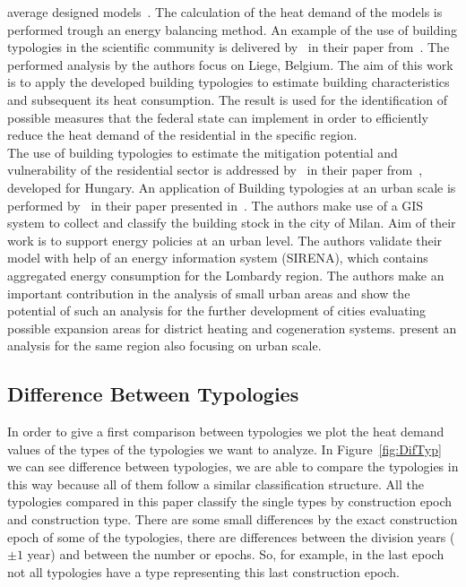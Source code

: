 \documentclass[authoryear,preprint,review,12pt]{elsarticle}
\begin{document}
\begin{linenumbers}
average designed models~\cite{Kragh.2013}.  The calculation of the heat
demand of the models is performed trough an energy balancing method.  An
example of the use of building typologies in the scientific community is
delivered by~\citeauthor{Singh.2013} in their paper
from~\citeyear{Singh.2013}.  The performed analysis by the authors
focus on Liege, Belgium. The aim of this work is to apply the developed
building typologies to estimate building characteristics and subsequent its
heat consumption. The result is used for the identification of possible
measures that the federal state can implement in order to efficiently reduce
the heat demand of the residential in the specific region.\\

The use of building typologies to estimate the mitigation potential and
vulnerability of the residential sector is addressed
by~\citeauthor{Hrabovszky.2013} in their paper
from~\citeyear{Hrabovszky.2013}, developed for Hungary.  An
application of Building typologies at an urban scale is performed
by~\citeauthor{Manfren.2011} in their paper
presented in~\citeyear{Manfren.2011}.  The
authors make use of a GIS system to collect and classify the building stock in
the city of Milan.  Aim of their work is to support energy policies at an urban
level.  The authors validate their model with help of an energy information
system (SIRENA), which contains aggregated energy consumption for the Lombardy
region.
The authors make an important contribution in the analysis of small urban areas
and show the potential of such an analysis for the further development of
cities evaluating possible expansion areas for district heating and
cogeneration systems. \citet{DallO.2012} present
an analysis for the same region also focusing on urban scale.  \\



\subsection{Difference Between Typologies}

In order to give a first comparison between typologies we plot the heat demand
values of the types of the typologies we want to analyze.  In
Figure~\ref{fig:DifTyp} we can see difference between typologies, we are able
to compare the typologies in this way because all of them follow a similar
classification structure.  All the typologies compared in this paper classify
the single types by construction epoch and construction type. There are some
small differences by the exact construction epoch of some of the typologies,
there are differences between the division years ($\pm 1$ year) and between the
number or epochs.  So, for example, in the last epoch not all typologies have a
type representing this last construction epoch.\\


\end{linenumbers}
\end{document}
